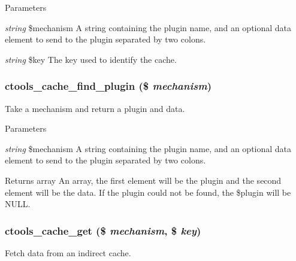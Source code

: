 \begin{DoxyParams}{Parameters}
\item[{\em string}]\$mechanism A string containing the plugin name, and an optional data element to send to the plugin separated by two colons.\item[{\em string}]\$key The key used to identify the cache. \end{DoxyParams}
\hypertarget{ctools_2includes_2cache_8inc_ae2a3a4be93449ac5ed9c98c3b40f9004}{
\subsubsection[{ctools\_\-cache\_\-find\_\-plugin}]{\setlength{\rightskip}{0pt plus 5cm}ctools\_\-cache\_\-find\_\-plugin (\$ {\em mechanism})}}
\label{ctools_2includes_2cache_8inc_ae2a3a4be93449ac5ed9c98c3b40f9004}
Take a mechanism and return a plugin and data.


\begin{DoxyParams}{Parameters}
\item[{\em string}]\$mechanism A string containing the plugin name, and an optional data element to send to the plugin separated by two colons.\end{DoxyParams}
\begin{DoxyReturn}{Returns}
array An array, the first element will be the plugin and the second element will be the data. If the plugin could not be found, the \$plugin will be NULL. 
\end{DoxyReturn}
\hypertarget{ctools_2includes_2cache_8inc_aecf3d4869c6b8eabd5d9be3dfd6d08b2}{
\subsubsection[{ctools\_\-cache\_\-get}]{\setlength{\rightskip}{0pt plus 5cm}ctools\_\-cache\_\-get (\$ {\em mechanism}, \/  \$ {\em key})}}
\label{ctools_2includes_2cache_8inc_aecf3d4869c6b8eabd5d9be3dfd6d08b2}
Fetch data from an indirect cache.


